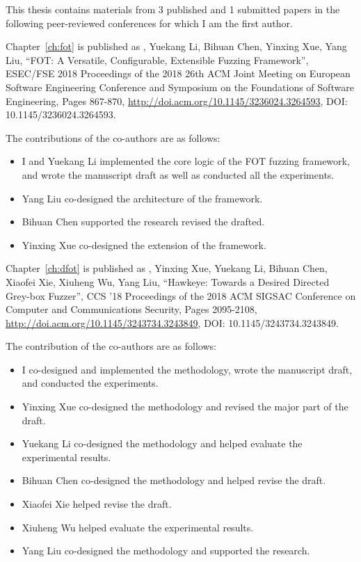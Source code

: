 \noindent This thesis contains materials from 3 published and 1 submitted papers in the following peer-reviewed conferences for which I am the first author.

\noindent Chapter~\ref{ch:fot} is published as \myname, Yuekang Li, Bihuan Chen, Yinxing Xue, Yang Liu, ``FOT: A Versatile, Configurable, Extensible Fuzzing Framework'', ESEC/FSE 2018 Proceedings of the 2018 26th ACM Joint Meeting on European Software Engineering Conference and Symposium on the Foundations of Software Engineering, Pages 867-870, \url{http://doi.acm.org/10.1145/3236024.3264593}, DOI: 10.1145/3236024.3264593.

\noindent The contributions of the co-authors are as follows:
\begin{itemize}
  \item I and Yuekang Li implemented the core logic of the FOT fuzzing framework, and wrote the manuscript draft as well as conducted all the experiments.
  \item Yang Liu co-designed the architecture of the framework.
  \item Bihuan Chen supported the research revised the drafted.
  \item Yinxing Xue co-designed the \dFOT extension of the framework.
\end{itemize}

\noindent Chapter~\ref{ch:dfot} is published as \myname, Yinxing Xue, Yuekang Li, Bihuan Chen, Xiaofei Xie, Xiuheng Wu, Yang Liu, ``Hawkeye: Towards a Desired Directed Grey-box Fuzzer'', CCS '18 Proceedings of the 2018 ACM SIGSAC Conference on Computer and Communications Security, Pages 2095-2108, \url{http://doi.acm.org/10.1145/3243734.3243849}, DOI: 10.1145/3243734.3243849.

\noindent The contribution of the co-authors are as follows:
\begin{itemize}
	\item I co-designed and implemented the methodology, wrote the manuscript draft, and conducted the experiments.
	\item Yinxing Xue co-designed the methodology and revised the major part of the draft.
	\item Yuekang Li co-designed the methodology and helped evaluate the experimental results.
	\item Bihuan Chen co-designed the methodology and helped revise the draft.
	\item Xiaofei Xie helped revise the draft.
	\item Xiuheng Wu helped evaluate the experimental results.
	\item Yang Liu co-designed the methodology and supported the research.
\end{itemize}

